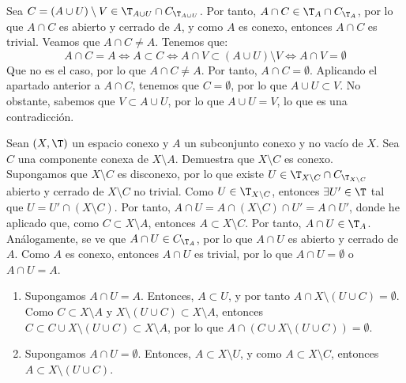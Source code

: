 \begin{ejercicio}
\begin{enumerate}
        Sea $C=(A\cup U)\setminus V\in \T_{A\cup U}\cap C_{\T_{A\cup U}}$. Por tanto, $A\cap C \in \T_A\cap C_{\T_A}$, por lo que $A\cap C$ es abierto y cerrado de $A$, y como $A$ es conexo, entonces $A\cap C$ es trivial.
        Veamos que $A\cap C\neq A$. Tenemos que:
        \begin{equation*}
            A \cap C = A\Longleftrightarrow A\subset C \Longleftrightarrow A\cap V \subset (A\cup U)\setminus V \Longleftrightarrow A\cap V = \emptyset
        \end{equation*}
        Que no es el caso, por lo que $A\cap C\neq A$. Por tanto, $A\cap C=\emptyset$. Aplicando el apartado anterior a $A\cap C$, tenemos que $C=\emptyset$, por lo que $A\cup U \subset V$. No obstante, sabemos que
        $V\subset A\cup U$, por lo que $A\cup U = V$, lo que es una contradicción.
    \end{enumerate}
\end{ejercicio}

\begin{ejercicio}
    Sean $(X, \T)$ un espacio conexo y $A$ un subconjunto conexo y no vacío de $X$. Sea $C$ una componente conexa de $X \setminus A$. Demuestra que $X \setminus C$ es conexo.\\

    Supongamos que $X\setminus C$ es disconexo, por lo que existe $U \in \T_{X\setminus C}\cap C_{\T_{X\setminus C}}$ abierto y cerrado de $X\setminus C$
    no trivial. Como $U\in \T_{X\setminus C}$, entonces $\exists U'\in \T$ tal que $U=U'\cap (X\setminus C)$. Por tanto, $A\cap U=A\cap (X\setminus C) \cap U' = A\cap U'$, donde he aplicado que,
    como $C\subset X\setminus A$, entonces $A\subset X\setminus C$. Por tanto, $A\cap U\in \T_A$. Análogamente, se ve que $A\cap U\in C_{\T_A}$, por lo que $A\cap U$ es abierto y cerrado de $A$. Como $A$ es conexo,
    entonces $A\cap U$ es trivial, por lo que $A\cap U=\emptyset$ o $A\cap U=A$.
    \begin{enumerate}
        \item Supongamos $A\cap U=A$. Entonces, $A\subset U$, y por tanto $A\cap X\setminus (U\cup C) = \emptyset$. Como $C\subset X\setminus A$ y $X\setminus (U\cup C)\subset X\setminus A$, entonces
        $C\subset C\cup X\setminus (U\cup C) \subset X\setminus A$, por lo que $A\cap \left(C\cup X\setminus (U\cup C)\right) = \emptyset$.

        \item Supongamos $A\cap U=\emptyset$. Entonces, $A\subset X\setminus U$, y como $A\subset X\setminus C$, entonces $A\subset X\setminus (U\cup C)$.
    \end{enumerate}
\end{ejercicio}


